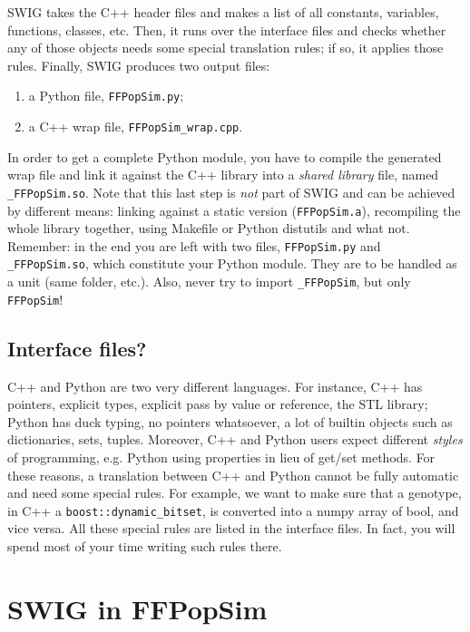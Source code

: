 \documentclass[12pt,a4paper,notitlepage,onecolumn]{article}
\begin{document}
SWIG takes the {\color{blue}C++ header files} and makes a list of all constants,
variables, functions, classes, etc. Then, it runs over the {\color{red}interface
files} and checks whether any of those objects needs some special translation
rules; if so, it applies those rules. Finally, SWIG produces two output files:
\begin{enumerate}
\item a Python file, \texttt{FFPopSim.py};
\item a C++ wrap file, \texttt{FFPopSim\_wrap.cpp}.
\end{enumerate}
In order to get a complete Python module, you have to compile the generated wrap
file and link it against the C++ library into a \textit{shared library} file, named
\texttt{\_FFPopSim.so}. Note that this last step is \textit{not} part of SWIG
and can be achieved by different means: linking against a static version
(\texttt{FFPopSim.a}), recompiling the whole library together, using Makefile or
Python distutils and what not. Remember: in the end you are left with two files,
\texttt{FFPopSim.py} and \texttt{\_FFPopSim.so}, which constitute your Python
module. They are to be handled as a unit (same folder, etc.). Also, never try to
import \texttt{\_FFPopSim}, but only \texttt{FFPopSim}!

\subsection{{\color{red}Interface files}?}
C++ and Python are two very different languages. For instance, C++ has pointers,
explicit types, explicit pass by value or reference, the STL library; Python has
duck typing, no pointers whatsoever, a lot of builtin objects such as
dictionaries, sets, tuples.  Moreover, C++ and Python users expect different
\textit{styles} of programming, e.g. Python using properties in lieu of get/set
methods. For these reasons, a translation between C++ and Python cannot be fully
automatic and need some special rules. For example, we want to make sure that a
genotype, in C++ a \texttt{boost::dynamic\_bitset}, is converted into a numpy
array of bool, and vice versa. All these special rules are listed in the
interface files. In fact, you will spend most of your time writing such rules there.

\section{SWIG in FFPopSim}
\end{document}
